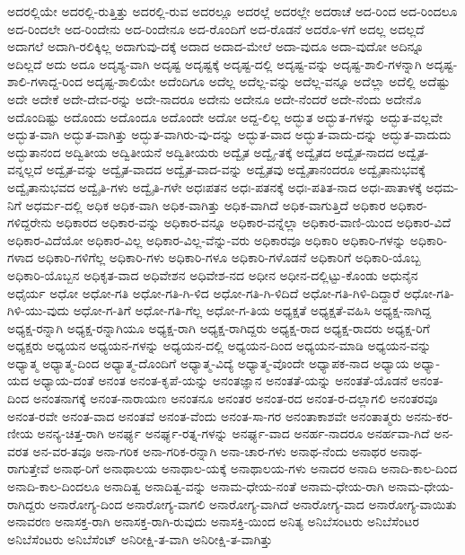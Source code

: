 {ಅದರಲ್ಲಿಯೇ
ಅದರಲ್ಲಿ-ರುತ್ತಿತ್ತು
ಅದರಲ್ಲಿ-ರುವ
ಅದರಲ್ಲೂ
ಅದರಲ್ಲೆ
ಅದರಲ್ಲೇ
ಅದರಾಚೆ
ಅದ-ರಿಂದ
ಅದ-ರಿಂದಲೂ
ಅದ-ರಿಂದಲೇ
ಅದ-ರಿಂದೇನು
ಅದ-ರಿಂದೇನೂ
ಅದ-ರೊಂದಿಗೆ
ಅದ-ರೊಡನೆ
ಅದರೊ-ಳಗೆ
ಅದಲ್ಲ
ಅದಲ್ಲದೆ
ಅದಾಗಲೆ
ಅದಾಗಿ-ರಲಿಕ್ಕಿಲ್ಲ
ಅದಾಗುವು-ದಕ್ಕೆ
ಅದಾದ
ಅದಾದ-ಮೇಲೆ
ಅದಾ-ವುದೂ
ಅದಾ-ವುದೋ
ಅದಿನ್ನೂ
ಅದಿಲ್ಲದೆ
ಅದು
ಅದೂ
ಅದೃಶ್ಯ-ವಾಗಿ
ಅದೃಷ್ಟ
ಅದೃಷ್ಟಕ್ಕೆ
ಅದೃಷ್ಟ-ದಲ್ಲಿ
ಅದೃಷ್ಟ-ವನ್ನು
ಅದೃಷ್ಟ-ಶಾಲಿ-ಗಳನ್ನಾಗಿ
ಅದೃಷ್ಟ-ಶಾಲಿ-ಗಳಾದ್ದ-ರಿಂದ
ಅದೃಷ್ಟ-ಶಾಲಿಯೇ
ಅದೆಂದಿಗೂ
ಅದೆಲ್ಲ
ಅದೆಲ್ಲ-ವನ್ನು
ಅದೆಲ್ಲ-ವನ್ನೂ
ಅದೆಲ್ಲಾ
ಅದೆಲ್ಲಿ
ಅದೆಷ್ಟು
ಅದೇ
ಅದೇಕೆ
ಅದೇ-ದೇವ-ರನ್ನು
ಅದೇ-ನಾದರೂ
ಅದೇನು
ಅದೇನೂ
ಅದೇ-ನೆಂದರೆ
ಅದೇ-ನೆಂದು
ಅದೇನೊ
ಅದೊಂದಿಷ್ಟು
ಅದೊಂದು
ಅದೊಂದೂ
ಅದೊಂದೇ
ಅದೋ
ಅದ್ದ-ಲಿಲ್ಲ
ಅದ್ಭುತ
ಅದ್ಭುತ-ಗಳನ್ನು
ಅದ್ಭುತ-ವಲ್ಲವೇ
ಅದ್ಭುತ-ವಾಗಿ
ಅದ್ಭುತ-ವಾಗಿತ್ತು
ಅದ್ಭುತ-ವಾಗಿರು-ವು-ದನ್ನು
ಅದ್ಭುತ-ವಾದ
ಅದ್ಭುತ-ವಾದು-ದನ್ನು
ಅದ್ಭುತ-ವಾದುದು
ಅದ್ಭುತಾನಂದ
ಅದ್ವಿತೀಯ
ಅದ್ವಿತೀಯನೆ
ಅದ್ವಿತೀಯರು
ಅದ್ವೈತ
ಅದ್ವೈ-ತಕ್ಕೆ
ಅದ್ವೈತದ
ಅದ್ವೈತ-ನಾದದ
ಅದ್ವೈತ-ವನ್ನಲ್ಲದೆ
ಅದ್ವೈತ-ವನ್ನು
ಅದ್ವೈತ-ವಾದದ
ಅದ್ವೈತ-ವಾದ-ವನ್ನು
ಅದ್ವೈತವು
ಅದ್ವೈತಾನಂದರೂ
ಅದ್ವೈತಾನುಭವಕ್ಕೆ
ಅದ್ವೈತಾನುಭವದ
ಅದ್ವೈತಿ-ಗಳು
ಅದ್ವೈತಿ-ಗಳೇ
ಅಧಃಪತನ
ಅಧಃ-ಪತನಕ್ಕೆ
ಅಧಃ-ಪತಿತ-ನಾದ
ಅಧಃ-ಪಾತಾಳಕ್ಕೆ
ಅಧಮ-ನಿಗೆ
ಅಧರ್ಮ-ದಲ್ಲಿ
ಅಧಿಕ
ಅಧಿಕ-ವಾಗಿ
ಅಧಿಕ-ವಾಗಿತ್ತು
ಅಧಿಕ-ವಾಗಿದೆ
ಅಧಿಕ-ವಾಗುತ್ತಿದೆ
ಅಧಿಕಾರ
ಅಧಿಕಾರ-ಗಳಿದ್ದರೇನು
ಅಧಿಕಾರದ
ಅಧಿಕಾರ-ವನ್ನು
ಅಧಿಕಾರ-ವನ್ನೂ
ಅಧಿಕಾರ-ವನ್ನೆಲ್ಲಾ
ಅಧಿಕಾರ-ವಾಣಿ-ಯಿಂದ
ಅಧಿಕಾರ-ವಿದೆ
ಅಧಿಕಾರ-ವಿದೆಯೋ
ಅಧಿಕಾರ-ವಿಲ್ಲ
ಅಧಿಕಾರ-ವಿಲ್ಲ-ವೆನ್ನು-ವರು
ಅಧಿಕಾರವೂ
ಅಧಿಕಾರಿ
ಅಧಿಕಾರಿ-ಗಳನ್ನು
ಅಧಿಕಾರಿ-ಗಳಾದ
ಅಧಿಕಾರಿ-ಗಳಿಗೆಲ್ಲ
ಅಧಿಕಾರಿ-ಗಳು
ಅಧಿಕಾರಿ-ಗಳೂ
ಅಧಿಕಾರಿ-ಗಳೊಡನೆ
ಅಧಿಕಾರಿಗೆ
ಅಧಿಕಾರಿ-ಯೊಬ್ಬ
ಅಧಿಕಾರಿ-ಯೊಬ್ಬನ
ಅಧಿಕೃತ-ವಾದ
ಅಧಿವೇಶನ
ಅಧಿವೇಶ-ನದ
ಅಧೀನ
ಅಧೀನ-ದಲ್ಲಿಟ್ಟು-ಕೊಂಡು
ಅಧುನೈನ
ಅಧೈರ್ಯ
ಅಧೋ
ಅಧೋ-ಗತಿ
ಅಧೋ-ಗತಿ-ಗಿ-ಳಿದ
ಅಧೋ-ಗತಿ-ಗಿ-ಳಿದಿದೆ
ಅಧೋ-ಗತಿ-ಗಿಳಿ-ದಿದ್ದಾರೆ
ಅಧೋ-ಗತಿ-ಗಿಳಿ-ಯು-ವುದು
ಅಧೋ-ಗ-ತಿಗೆ
ಅಧೋ-ಗತಿ-ಗೆಲ್ಲ
ಅಧೋ-ಗ-ತಿಯ
ಅಧ್ಯಕ್ಷತೆ
ಅಧ್ಯಕ್ಷತೆ-ವಹಿಸಿ
ಅಧ್ಯಕ್ಷ-ನಾಗಿದ್ದ
ಅಧ್ಯಕ್ಷ-ರನ್ನಾಗಿ
ಅಧ್ಯಕ್ಷ-ರನ್ನಾಗಿಯೂ
ಅಧ್ಯಕ್ಷ-ರಾಗಿ
ಅಧ್ಯಕ್ಷ-ರಾಗಿದ್ದರು
ಅಧ್ಯಕ್ಷ-ರಾದ
ಅಧ್ಯಕ್ಷ-ರಾದರು
ಅಧ್ಯಕ್ಷ-ರಿಗೆ
ಅಧ್ಯಕ್ಷರು
ಅಧ್ಯಯನ
ಅಧ್ಯಯನ-ಗಳನ್ನು
ಅಧ್ಯಯನ-ದಲ್ಲಿ
ಅಧ್ಯಯನ-ದಿಂದ
ಅಧ್ಯಯನ-ಮಾಡಿ
ಅಧ್ಯಯನ-ವನ್ನು
ಅಧ್ಯಾತ್ಮ
ಅಧ್ಯಾತ್ಮ-ದಿಂದ
ಅಧ್ಯಾತ್ಮ-ದೊಂದಿಗೆ
ಅಧ್ಯಾತ್ಮ-ವಿದ್ಯೆ
ಅಧ್ಯಾತ್ಮ-ವೊಂದೇ
ಅಧ್ಯಾಪಕ-ನಾದ
ಅಧ್ಯಾಯ
ಅಧ್ಯಾ-ಯದ
ಅಧ್ಯಾಯ-ದಂತೆ
ಅನಂತ
ಅನಂತ-ಕೃಪೆ-ಯನ್ನು
ಅನಂತಜ್ಞಾನ
ಅನಂತತೆ-ಯನ್ನು
ಅನಂತತೆ-ಯೊಡನೆ
ಅನಂತ-ದಿಂದ
ಅನಂತನಾಗಕ್ಕೆ
ಅನಂತ-ನಾರಾಯಣ
ಅನಂತನೂ
ಅನಂತರ
ಅನಂತ-ರದ
ಅನಂತ-ರ-ದಲ್ಲಾಗಲಿ
ಅನಂತರವೂ
ಅನಂತ-ರವೇ
ಅನಂತ-ವಾದ
ಅನಂತವೆ
ಅನಂತ-ವೆಂದು
ಅನಂತ-ಸಾ-ಗರ
ಅನಂತಾಕಾಶವೇ
ಅನಂತಾತ್ಮರು
ಅನನು-ಕರ-ಣೀಯ
ಅನನ್ಯ-ಚಿತ್ತ-ರಾಗಿ
ಅನರ್ಘ್ಯ
ಅನರ್ಘ್ಯ-ರತ್ನ-ಗಳನ್ನು
ಅನರ್ಘ್ಯ-ವಾದ
ಅನರ್ಹ-ನಾದರೂ
ಅನರ್ಹವಾ-ಗಿದೆ
ಅನ-ವರತ
ಅನ-ವರ-ತವೂ
ಅನಾ-ಗರಿಕ
ಅನಾ-ಗರಿಕ-ರನ್ನಾಗಿ
ಅನಾ-ಚಾರ-ಗಳು
ಅನಾಥ-ನೆಂದು
ಅನಾಥರ
ಅನಾಥ-ರಾಗುತ್ತೇವೆ
ಅನಾಥ-ರಿಗೆ
ಅನಾಥಾಲಯ
ಅನಾಥಾಲ-ಯಕ್ಕೆ
ಅನಾಥಾಲಯ-ಗಳು
ಅನಾದರ
ಅನಾದಿ
ಅನಾದಿ-ಕಾಲ-ದಿಂದ
ಅನಾದಿ-ಕಾಲ-ದಿಂದಲೂ
ಅನಾದಿತ್ವ
ಅನಾದಿತ್ವ-ವನ್ನು
ಅನಾಮ-ಧೇಯ-ನಂತೆ
ಅನಾಮ-ಧೇಯ-ರಾಗಿ
ಅನಾಮ-ಧೇಯ-ರಾಗಿದ್ದರು
ಅನಾರೋಗ್ಯ-ದಿಂದ
ಅನಾರೋಗ್ಯ-ವಾಗಲಿ
ಅನಾರೋಗ್ಯ-ವಾಗಿದೆ
ಅನಾರೋಗ್ಯ-ವಾದ
ಅನಾರೋಗ್ಯ-ವಾಯಿತು
ಅನಾವರಣ
ಅನಾಸಕ್ತ-ರಾಗಿ
ಅನಾಸಕ್ತ-ರಾಗಿ-ರುವುದು
ಅನಾಸಕ್ತಿ-ಯಿಂದ
ಅನಿತ್ಯ
ಅನಿಬೆಸಂಟರು
ಅನಿಬೆಸೆಂಟರ
ಅನಿಬೆಸೆಂಟರು
ಅನಿಬೆಸೆಂಟ್
ಅನಿರೀಕ್ಷಿ-ತ-ವಾಗಿ
ಅನಿರೀಕ್ಷಿ-ತ-ವಾಗಿತ್ತು
}
